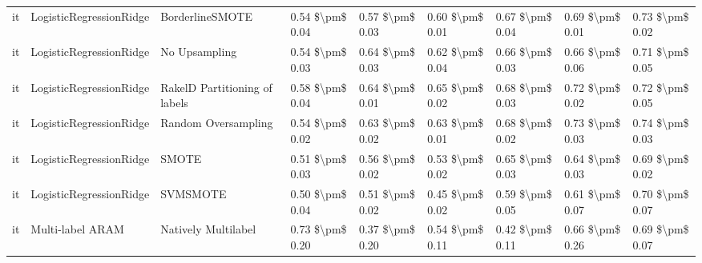 \begin{tabular}{lllllllll}
      it &         LogisticRegressionRidge &               BorderlineSMOTE &     0.54 \$\textbackslash pm\$ 0.04 &           0.57 \$\textbackslash pm\$ 0.03 &       0.60 \$\textbackslash pm\$ 0.01 &        0.67 \$\textbackslash pm\$ 0.04 &                         0.69 \$\textbackslash pm\$ 0.01 &     0.73 \$\textbackslash pm\$ 0.02 \\
      it &         LogisticRegressionRidge &                 No Upsampling &     0.54 \$\textbackslash pm\$ 0.03 &           0.64 \$\textbackslash pm\$ 0.03 &       0.62 \$\textbackslash pm\$ 0.04 &        0.66 \$\textbackslash pm\$ 0.03 &                         0.66 \$\textbackslash pm\$ 0.06 &     0.71 \$\textbackslash pm\$ 0.05 \\
      it &         LogisticRegressionRidge & RakelD Partitioning of labels &     0.58 \$\textbackslash pm\$ 0.04 &           0.64 \$\textbackslash pm\$ 0.01 &       0.65 \$\textbackslash pm\$ 0.02 &        0.68 \$\textbackslash pm\$ 0.03 &                         0.72 \$\textbackslash pm\$ 0.02 &     0.72 \$\textbackslash pm\$ 0.05 \\
      it &         LogisticRegressionRidge &           Random Oversampling &     0.54 \$\textbackslash pm\$ 0.02 &           0.63 \$\textbackslash pm\$ 0.02 &       0.63 \$\textbackslash pm\$ 0.01 &        0.68 \$\textbackslash pm\$ 0.02 &                         0.73 \$\textbackslash pm\$ 0.03 &     0.74 \$\textbackslash pm\$ 0.03 \\
      it &         LogisticRegressionRidge &                         SMOTE &     0.51 \$\textbackslash pm\$ 0.03 &           0.56 \$\textbackslash pm\$ 0.02 &       0.53 \$\textbackslash pm\$ 0.02 &        0.65 \$\textbackslash pm\$ 0.03 &                         0.64 \$\textbackslash pm\$ 0.03 &     0.69 \$\textbackslash pm\$ 0.02 \\
      it &         LogisticRegressionRidge &                      SVMSMOTE &     0.50 \$\textbackslash pm\$ 0.04 &           0.51 \$\textbackslash pm\$ 0.02 &       0.45 \$\textbackslash pm\$ 0.02 &        0.59 \$\textbackslash pm\$ 0.05 &                         0.61 \$\textbackslash pm\$ 0.07 &     0.70 \$\textbackslash pm\$ 0.07 \\
      it &                Multi-label ARAM &           Natively Multilabel &     0.73 \$\textbackslash pm\$ 0.20 &           0.37 \$\textbackslash pm\$ 0.20 &       0.54 \$\textbackslash pm\$ 0.11 &        0.42 \$\textbackslash pm\$ 0.11 &                         0.66 \$\textbackslash pm\$ 0.26 &     0.69 \$\textbackslash pm\$ 0.07 \\

\end{tabular}
